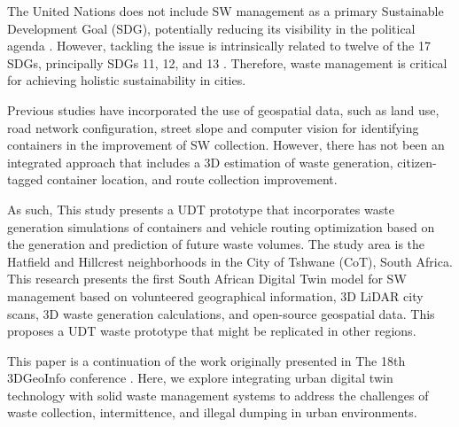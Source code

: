 \documentclass[authoryear,preprint,review,11pt,doubleblind]{elsarticle}
\begin{document}
    The United Nations does not include SW management as a primary Sustainable Development Goal (SDG), potentially reducing its visibility in the political agenda \citep{rodicResolvingGovernanceIssues2017}. However, tackling the issue is intrinsically related to twelve of the 17 SDGs, principally SDGs 11, 12, and 13 \citep{Wilson2015}. Therefore, waste management is critical for achieving holistic sustainability in cities.
    

    Previous studies have incorporated the use of geospatial data, such as land use, road network configuration, street slope \citep{Hina2020, Sahib2021, Malakahmad2014} and computer vision for identifying containers  \citep{Moral2022} in the improvement of SW collection. However, there has not been an integrated approach that includes a 3D estimation of waste generation, citizen-tagged container location, and route collection improvement.

    As such, This study presents a UDT prototype that incorporates waste generation simulations of containers and vehicle routing optimization based on the generation and prediction of future waste volumes. The study area is the Hatfield and Hillcrest neighborhoods in the City of Tshwane (CoT), South Africa. This research presents the first South African Digital Twin model for SW management based on volunteered geographical information, 3D LiDAR city scans, 3D waste generation calculations, and open-source geospatial data. This proposes a UDT waste prototype that might be replicated in other regions.

This paper is a continuation of the work originally presented in The 18th 3DGeoInfo conference \citep{cardenasivanSolidWasteVirtual24}. Here, we explore integrating urban digital twin technology with solid waste management systems to address the challenges of waste collection, intermittence, and illegal dumping in urban environments.
\end{document}
